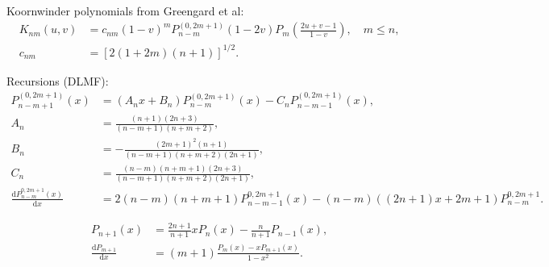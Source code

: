 \documentclass[a4paper,12pt]{article}
\newcommand{\D}{\mathrm{d}}
\begin{document}
Koornwinder polynomials from Greengard et al:
\begin{align}
  \label{equ:koornwinder:1}
  K_{nm}(u,v)
  &=
    c_{nm}(1-v)^{m}
    P_{n-m}^{(0,2m+1)}(1-2v)
    P_{m}
    \left(
    \frac{2u+v-1}{1-v}
  \right), \quad m\leq n,\\
  c_{nm} &=
  \left[
    2(1+2m)(n+1)
  \right]^{1/2}.
\end{align}

Recursions (DLMF):
\begin{align}
  \label{equ:jacobi:1}
  P_{n-m+1}^{(0,2m+1)}(x)
  &=
    (A_{n}x + B_{n})P_{n-m}^{(0,2m+1)}(x) -
    C_{n}P_{n-m-1}^{(0,2m+1)}(x),\\
  A_{n} &= \frac{(n+1)(2n+3)}{(n-m+1)(n+m+2)},\\
  B_{n} &= -\frac{(2m+1)^{2}(n+1)}{(n-m+1)(n+m+2)(2n+1)},\\
  C_{n} &= \frac{(n-m)(n+m+1)(2n+3)}{(n-m+1)(n+m+2)(2n+1)},\\
  \frac{\D P_{n-m}^{0,2m+1}(x)}{\D x}
  &=
  2(n-m)(n+m+1)P_{n-m-1}^{0,2m+1}(x) -
  (n-m)((2n+1)x + 2m+1)P_{n-m}^{0,2m+1}.
\end{align}

\begin{align}
  \label{equ:legendre}
  P_{n+1}(x)
  &=
  \frac{2n+1}{n+1}xP_{n}(x) - \frac{n}{n+1}P_{n-1}(x),\\
  \frac{\D P_{m+1}}{\D x}
  &=
  (m+1)\frac{P_{m}(x) - xP_{m+1}(x)}{1-x^{2}}.
\end{align}
\end{document}
